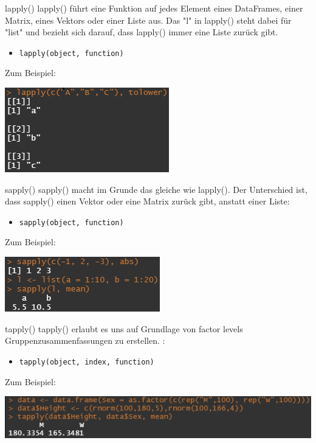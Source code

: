 \documentclass[xcolor=dvipsnames, aspectratio = 169]{beamer}
\begin{document}
\begin{frame}[fragile]{lapply()}
	lapply() führt eine Funktion auf jedes Element eines DataFrames, einer Matrix, eines Vektors oder einer Liste aus. Das "l" in lapply() steht dabei für "list" und bezieht sich darauf, dass lapply() immer eine Liste zurück gibt.
	\begin{itemize}
		\item \verb+lapply(object, function)+
	\end{itemize}
	Zum Beispiel:\\
	\begin{center}
		\includegraphics{lapply}
	\end{center}
	
	
\end{frame}

\begin{frame}[fragile]{sapply()}
	sapply() macht im Grunde das gleiche wie lapply(). Der Unterschied ist, dass sapply() einen Vektor oder eine Matrix zurück gibt, anstatt einer Liste:
	\begin{itemize}
		\item \verb+sapply(object, function)+
	\end{itemize}
	Zum Beispiel:\\
	\begin{center}
		\includegraphics{sapply}
	\end{center}
\end{frame}

\begin{frame}[fragile]{tapply()}
	tapply() erlaubt es uns auf Grundlage von factor levels Gruppenzusammenfassungen zu erstellen. :
	\begin{itemize}
		\item \verb+tapply(object, index, function)+
	\end{itemize}
	Zum Beispiel:\\
	\begin{center}
		\includegraphics{tapply}
	\end{center}
	
\end{frame}
\end{document}
